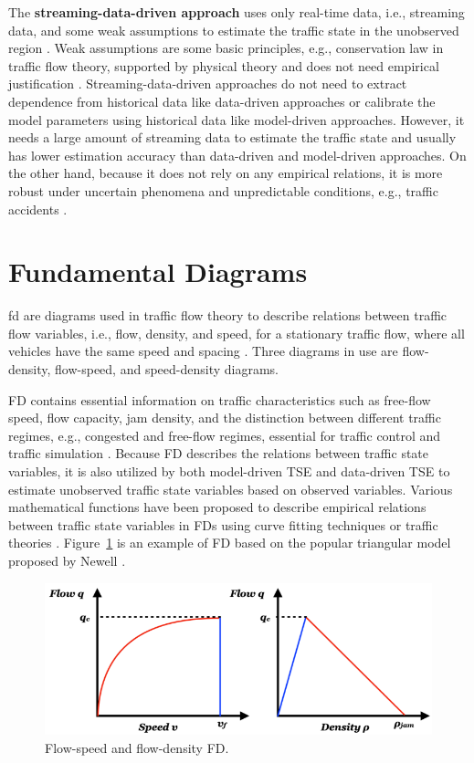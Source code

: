 \documentclass[english]{kththesis}
\begin{document}
The \textbf{streaming-data-driven approach} uses only real-time data, i.e., streaming data, and some weak assumptions to estimate the traffic state in the unobserved region \cite{seo_tse}. Weak assumptions are some basic principles, e.g., conservation law in traffic flow theory, supported by physical theory and does not need empirical justification \cite{seo_tse}. Streaming-data-driven approaches do not need to extract dependence from historical data like data-driven approaches or calibrate the model parameters using historical data like model-driven approaches. However, it needs a large amount of streaming data to estimate the traffic state and usually has lower estimation accuracy than data-driven and model-driven approaches. On the other hand, because it does not rely on any empirical relations, it is more robust under uncertain phenomena and unpredictable conditions, e.g., traffic accidents \cite{seo_tse}.

\section{Fundamental Diagrams}
\label{sec:fd}
\gls{fd} are diagrams used in traffic flow theory to describe relations between traffic flow variables, i.e., flow, density, and speed, for a stationary traffic flow, where all vehicles have the same speed and spacing \cite{sumalee_future_ITS, Hoogendoorn_traffic_flow_theory_tu-delft}. Three diagrams in use are flow-density, flow-speed, and speed-density diagrams.

FD contains essential information on traffic characteristics such as free-flow speed, flow capacity, jam density, and the distinction between different traffic regimes, e.g., congested and free-flow regimes, essential for traffic control and traffic simulation \cite{dervisoglu_auto-calibrate_fd, seo_fd_probe}. Because FD describes the relations between traffic state variables, it is also utilized by both model-driven TSE \cite{seo_fd_probe} and data-driven TSE \cite{anuar_flow_probe} to estimate unobserved traffic state variables based on observed variables. Various mathematical functions have been proposed to describe empirical relations between traffic state variables in FDs using curve fitting techniques or traffic theories \cite{seo_tse, Hoogendoorn_traffic_flow_theory_tu-delft}. Figure~\ref{fig:triangular_fd} is an example of FD based on the popular triangular model proposed by Newell \cite{newell_triangular_fd}. 

\begin{figure}[!ht]
    \centering
    \includegraphics[width=\textwidth]{triangular_fd.png}
    \caption{Flow-speed and flow-density FD.}
    \label{fig:triangular_fd}
\end{figure}
\end{document}
